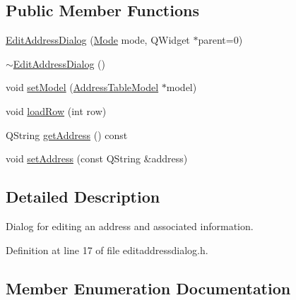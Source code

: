 \subsection*{Public Member Functions}
\begin{DoxyCompactItemize}
\item 
\hyperlink{class_edit_address_dialog_af9edc8753ff1c8ba8ec5dbedf97160ac}{Edit\+Address\+Dialog} (\hyperlink{class_edit_address_dialog_a456fdd27ee1c150824241ded7bb4de3a}{Mode} mode, Q\+Widget $\ast$parent=0)
\item 
\hyperlink{class_edit_address_dialog_ab4e5fcba5f0a10a4de260ca67d37f5bd}{$\sim$\+Edit\+Address\+Dialog} ()
\item 
void \hyperlink{class_edit_address_dialog_a57d26af2c34bd45c06596e9b3fc9a446}{set\+Model} (\hyperlink{class_address_table_model}{Address\+Table\+Model} $\ast$model)
\item 
void \hyperlink{class_edit_address_dialog_a45d90d6f757fb4b20788710c8533036b}{load\+Row} (int row)
\item 
Q\+String \hyperlink{class_edit_address_dialog_a578da50784f07bf8d291724f0299e074}{get\+Address} () const 
\item 
void \hyperlink{class_edit_address_dialog_afcaca5a8e493b9493d2ca2430f7ac5eb}{set\+Address} (const Q\+String \&address)
\end{DoxyCompactItemize}


\subsection{Detailed Description}
Dialog for editing an address and associated information. 

Definition at line 17 of file editaddressdialog.\+h.



\subsection{Member Enumeration Documentation}
\hypertarget{class_edit_address_dialog_a456fdd27ee1c150824241ded7bb4de3a}{}
